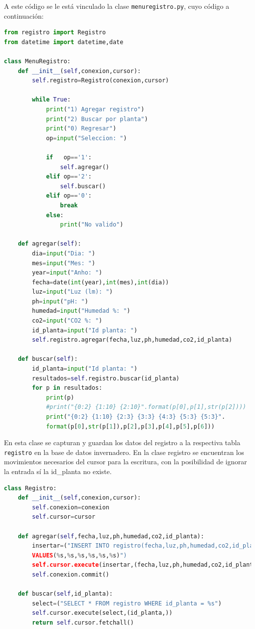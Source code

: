 \documentclass[fleqn,10pt]{article}
\begin{document}
A este código se le está vinculado la clase \texttt{menuregistro.py}, cuyo código a continuación:
\begin{lstlisting}[language=python,caption={\texttt{menuregistro.py}.}]
from registro import Registro
from datetime import datetime,date

class MenuRegistro:
    def __init__(self,conexion,cursor):
        self.registro=Registro(conexion,cursor)

        while True:
            print("1) Agregar registro")
            print("2) Buscar por planta")
            print("0) Regresar")
            op=input("Seleccion: ")

            if   op=='1':
                self.agregar()
            elif op=='2':
                self.buscar()
            elif op=='0':
                break
            else:
                print("No valido")

    def agregar(self):
        dia=input("Dia: ")
        mes=input("Mes: ")
        year=input("Anho: ")
        fecha=date(int(year),int(mes),int(dia))
        luz=input("Luz (lm): ")
        ph=input("pH: ")
        humedad=input("Humedad %: ")
        co2=input("CO2 %: ")
        id_planta=input("Id planta: ")
        self.registro.agregar(fecha,luz,ph,humedad,co2,id_planta)

    def buscar(self):
        id_planta=input("Id planta: ")
        resultados=self.registro.buscar(id_planta)
        for p in resultados:
            print(p)
            #print("{0:2} {1:10} {2:10}".format(p[0],p[1],str(p[2])))
            print("{0:2} {1:10} {2:3} {3:3} {4:3} {5:3} {5:3}".
            format(p[0],str(p[1]),p[2],p[3],p[4],p[5],p[6]))
\end{lstlisting}
En esta clase se capturan y guardan los datos del registro a la respectiva tabla \texttt{registro} en la base de datos invernadero. En la clase registro se encuentran los movimientos necesarios del cursor para la escritura, con la posibilidad de ignorar la entrada sí la id\_planta no existe.
\begin{lstlisting}[language=python,caption={\texttt{registro.py}.}]
class Registro:
    def __init__(self,conexion,cursor):
        self.conexion=conexion
        self.cursor=cursor

    def agregar(self,fecha,luz,ph,humedad,co2,id_planta):
        insertar=("INSERT INTO registro(fecha,luz,ph,humedad,co2,id_planta) 
        VALUES(%s,%s,%s,%s,%s,%s)")
        self.cursor.execute(insertar,(fecha,luz,ph,humedad,co2,id_planta))
        self.conexion.commit()

    def buscar(self,id_planta):
        select=("SELECT * FROM registro WHERE id_planta = %s")
        self.cursor.execute(select,(id_planta,))
        return self.cursor.fetchall()
\end{lstlisting}
\end{document}
